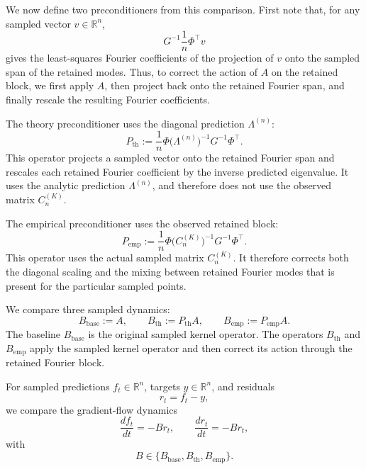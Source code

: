 We now define two preconditioners from this comparison. First note that, for any
sampled vector \(v\in\mathbb R^n\),
\[
	G^{-1}\frac1n\Phi^\top v
\]
gives the least-squares Fourier coefficients of the projection of \(v\) onto
the sampled span of the retained modes. Thus, to correct the action of \(A\) on
the retained block, we first apply \(A\), then project back onto the retained
Fourier span, and finally rescale the resulting Fourier coefficients.

The theory preconditioner uses the diagonal prediction \(\Lambda^{(n)}\):
\begin{equation}
	P_{\mathrm{th}}
	:=
	\frac1n
	\Phi
	\bigl(\Lambda^{(n)}\bigr)^{-1}
	G^{-1}
	\Phi^\top .
	\label{eq:method-theory-preconditioner}
\end{equation}
This operator projects a sampled vector onto the retained Fourier span and
rescales each retained Fourier coefficient by the inverse predicted eigenvalue.
It uses the analytic prediction \(\Lambda^{(n)}\), and therefore does not use
the observed matrix \(C_n^{(K)}\).

The empirical preconditioner uses the observed retained block:
\begin{equation}
	P_{\mathrm{emp}}
	:=
	\frac1n
	\Phi
	\bigl(C_n^{(K)}\bigr)^{-1}
	G^{-1}
	\Phi^\top .
	\label{eq:method-empirical-preconditioner}
\end{equation}
This operator uses the actual sampled matrix \(C_n^{(K)}\). It therefore
corrects both the diagonal scaling and the mixing between retained Fourier modes
that is present for the particular sampled points.

We compare three sampled dynamics:
\begin{equation}
	B_{\mathrm{base}}:=A,
	\qquad
	B_{\mathrm{th}}:=P_{\mathrm{th}}A,
	\qquad
	B_{\mathrm{emp}}:=P_{\mathrm{emp}}A.
	\label{eq:method-preconditioned-operators}
\end{equation}
The baseline \(B_{\mathrm{base}}\) is the original sampled kernel operator. The
operators \(B_{\mathrm{th}}\) and \(B_{\mathrm{emp}}\) apply the sampled kernel
operator and then correct its action through the retained Fourier block.

For sampled predictions \(f_t\in\mathbb R^n\), targets \(y\in\mathbb R^n\), and
residuals
\[
	r_t=f_t-y,
\]
we compare the gradient-flow dynamics
\begin{equation}
	\frac{d f_t}{dt}
	=
	- B r_t,
	\qquad
	\frac{d r_t}{dt}
	=
	- B r_t,
	\label{eq:method-sampled-operator-flow}
\end{equation}
with
\[
	B\in\{B_{\mathrm{base}},B_{\mathrm{th}},B_{\mathrm{emp}}\}.
\]


